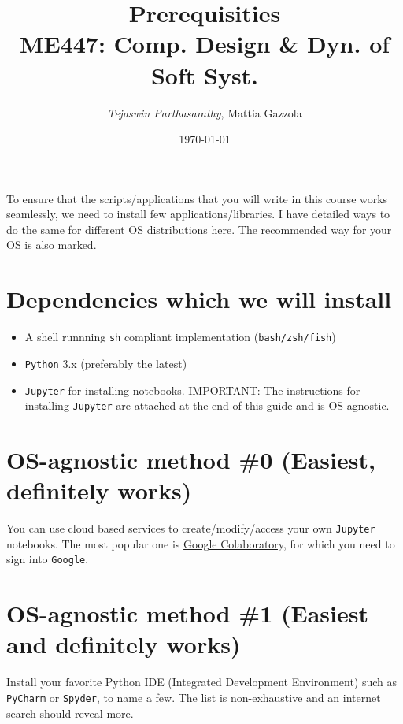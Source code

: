 \documentclass[11pt]{article}
\author{\emph{Tejaswin Parthasarathy}, Mattia Gazzola}
\date{\today}
\title{Prerequisities\\\medskip
\large ME447: Comp. Design \& Dyn. of Soft Syst.}
\begin{document}
\maketitle
To ensure that the scripts/applications that you will write in this course works
seamlessly, we need to install few applications/libraries. I have detailed ways
to do the same for different OS distributions here. The recommended way for your
OS is also marked.

\section*{Dependencies which we will install}
\label{sec:org95b54fc}
\begin{itemize}
\item A shell runnning \texttt{sh} compliant implementation (\texttt{bash/zsh/fish})
\item \texttt{Python} 3.x (preferably the latest)
\item \texttt{Jupyter} for installing notebooks. IMPORTANT: The instructions for installing
\texttt{Jupyter} are attached at the end of this guide and is OS-agnostic.
\end{itemize}

\section*{OS-agnostic method \#0 (Easiest, definitely works)}
\label{sec:org184ef39}
You can use cloud based services to create/modify/access your own \texttt{Jupyter}
notebooks. The most popular one is \href{https://colab.research.google.com/}{Google Colaboratory}, for which you need to
sign into \texttt{Google}.
\section*{OS-agnostic method \#1 (Easiest and definitely works)}
\label{sec:orge52f2f9}
Install your favorite Python IDE (Integrated Development Environment) such as
\texttt{PyCharm} or \texttt{Spyder}, to name a few. The list is non-exhaustive and an internet search
should reveal more.
\end{document}
